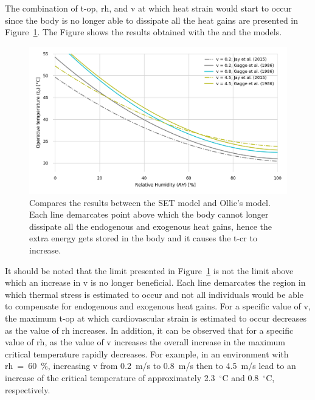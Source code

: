The combination of \ac{t-op}, \ac{rh}, and \ac{v} at which heat strain would start to occur since the body is no longer able to dissipate all the heat gains are presented in Figure~\ref{fig:comparison_air_speed}.
The Figure shows the results obtained with the  and the  models.

\begin{figure}[b!]
    \centering
    \includegraphics[width=\textwidth]{figures/comparison_air_speed.png}
    \caption{Compares the results between the SET model and Ollie's model.
    Each line demarcates point above which the body cannot longer dissipate all the endogenous and exogenous heat gains, hence the extra energy gets stored in the body and it causes the \acf{t-cr} to increase.}
    \label{fig:comparison_air_speed}
\end{figure}

It should be noted that the limit presented in Figure~\ref{fig:comparison_air_speed} is not the limit above which an increase in \ac{v} is no longer beneficial.
Each line demarcates the region in which thermal stress is estimated to occur and not all individuals would be able to compensate for endogenous and exogenous heat gains.
For a specific value of \ac{v}, the maximum \ac{t-op} at which cardiovascular strain is estimated to occur decreases as the value of \ac{rh} increases.
In addition, it can be observed that for a specific value of \ac{rh}, as the value of \ac{v} increases the overall increase in the maximum critical temperature rapidly decreases.
For example, in an environment with \ac{rh}~=~60~\%, increasing \ac{v} from 0.2~m/s to 0.8~m/s then to 4.5~m/s lead to an increase of the critical temperature of approximately 2.3~$^{\circ}$C and 0.8~$^{\circ}$C, respectively.

